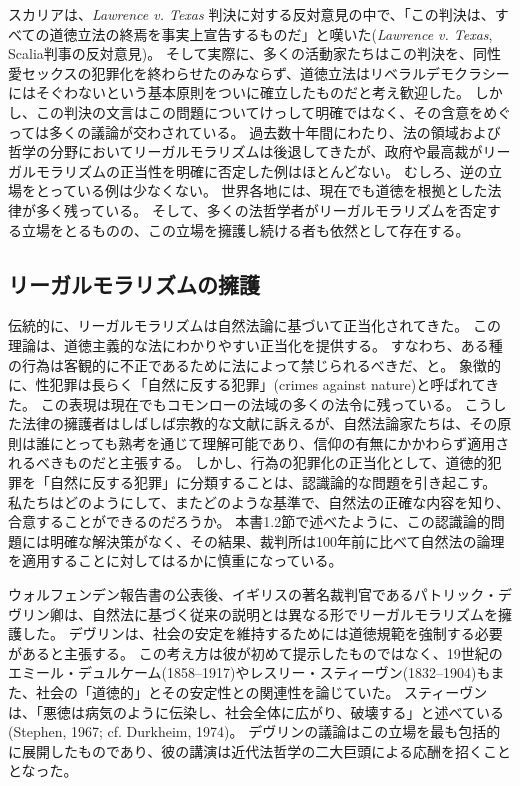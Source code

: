 \documentclass[paper=a4,book,openany]{jlreq}
\newcommand{\ig}[1]{}           %
\begin{document}
スカリアは、\emph{Lawrence v. Texas} 判決に対する反対意見の中で、「この判決は、すべての道徳立法の終焉を事実上宣告するものだ」と嘆いた(\emph{Lawrence v. Texas}, Scalia判事の反対意見)。
そして実際に、多くの活動家たちはこの判決を、同性愛セックスの犯罪化を終わらせたのみならず、道徳立法はリベラルデモクラシーにはそぐわないという基本原則をついに確立したものだと考え歓迎した。
しかし、この判決の文言はこの問題についてけっして明確ではなく、その含意をめぐっては多くの議論が交わされている。
過去数十年間にわたり、法の領域および哲学の分野においてリーガルモラリズムは後退してきたが、政府や最高裁がリーガルモラリズムの正当性を明確に否定した例はほとんどない。
むしろ、逆の立場をとっている例は少なくない。
世界各地には、現在でも道徳を根拠とした法律が多く残っている。
そして、多くの法哲学者がリーガルモラリズムを否定する立場をとるものの、この立場を擁護し続ける者も依然として存在する。

\subsection{リーガルモラリズムの擁護}

伝統的に、リーガルモラリズムは自然法論に基づいて正当化されてきた。
この理論は、道徳主義的な法にわかりやすい正当化を提供する。
すなわち、ある種の行為は客観的に不正であるために法によって禁じられるべきだ、と。
象徴的に、性犯罪は長らく「自然に反する犯罪」(crimes against nature)と呼ばれてきた。
この表現は現在でもコモンローの法域の多くの法令に残っている。
こうした法律の擁護者はしばしば宗教的な文献に訴えるが、自然法論家たちは、その原則は誰にとっても熟考を通じて理解可能であり、信仰の有無にかかわらず適用されるべきものだと主張する。
しかし、行為の犯罪化の正当化として、道徳的犯罪を「自然に反する犯罪」に分類することは、認識論的な問題を引き起こす。
私たちはどのようにして、またどのような基準で、自然法の正確な内容を知り、合意することができるのだろうか。
本書1.2節で述べたように、この認識論的問題には明確な解決策がなく、その結果、裁判所は100年前に比べて自然法の論理を適用することに対してはるかに慎重になっている。

ウォルフェンデン報告書の公表後、イギリスの著名裁判官であるパトリック・デヴリン\ig{Patrick Devlin}卿は、自然法に基づく従来の説明とは異なる形でリーガルモラリズムを擁護した。
デヴリン\ig{Patrick Devlin}は、社会の安定を維持するためには道徳規範を強制する必要があると主張する。
この考え方は彼が初めて提示したものではなく、19世紀のエミール・デュルケーム(1858--1917)やレスリー・スティーヴン(1832--1904)もまた、社会の「道徳的」とその安定性との関連性を論じていた。
スティーヴンは、「悪徳は病気のように伝染し、社会全体に広がり、破壊する」と述べている(Stephen, 1967; cf. Durkheim, 1974)。
\nocite{stephen67:liberty}\nocite{durkheim74:sociology}
デヴリン\ig{Patrick Devlin}の議論はこの立場を最も包括的に展開したものであり、彼の講演は近代法哲学の二大巨頭による応酬を招くこととなった。
\end{document}
